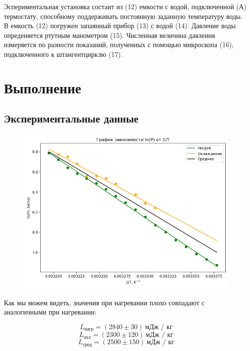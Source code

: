 \documentclass[a4paper]{article}
\begin{document}
Эспериментальная установка состаит из (12) емкости с водой,
подключенной (А) термостату, способному поддерживать постоянную заданную температуру воды.
В емкость (12) погружен запаянный прибор (13) с водой (14).
Давление воды опреденяется ртутным манометром (15). Численная величина давления
измеряется по разности показаний, полученных с помощью микроскопа (16), 
подключенного к штангентцирклю (17).

\newpage

\section{Выполнение}
\subsection{Экспериментальные данные}

\begin{figure}[h!]
    \centering
    \includegraphics[scale=0.85]{figure1.png}
\end{figure}

Как мы можем видеть, значения при нагревании плохо совпадают с аналогичными
при нагревании:


\begin{equation}
    L_\text{нагр} = (2840 \pm 30) \ \text{мДж / кг}
\end{equation}
\begin{equation}
    L_\text{охл} = (2300 \pm 120) \ \text{мДж / кг}
\end{equation}
\begin{equation}
    L_\text{сред} = (2500 \pm 150) \ \text{мДж / кг}
\end{equation}
\end{document}
